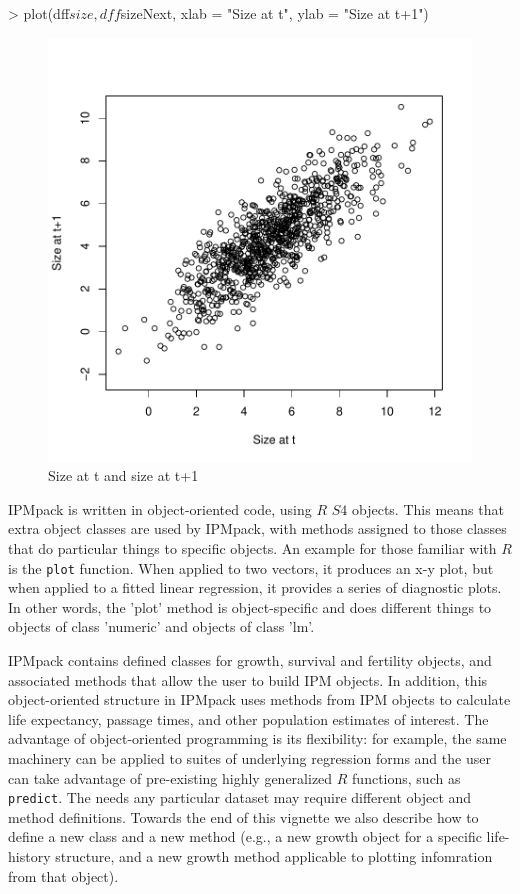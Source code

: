 \documentclass{article}
\begin{document}
\begin{Schunk}
\begin{Sinput}
> plot(dff$size, dff$sizeNext, xlab = "Size at t", ylab = "Size at t+1")
\end{Sinput}
\end{Schunk}
\begin{figure}
\begin{center}
\includegraphics{IPMpack_Vignette-fig0.pdf}
\end{center}
\caption{Size at t and size at t+1}
\label{fig:zero}
\end{figure}

IPMpack is written in object-oriented code, using $R$ $S4$ objects. This means that extra object classes are used by IPMpack, with methods assigned to those classes that do particular things to specific objects. An example for those familiar with $R$ is the {\tt plot} function. When applied to two vectors, it produces an x-y plot, but when applied to a fitted linear regression, it provides a series of diagnostic plots. In other words, the 'plot' method is object-specific and does different things to objects of class 'numeric' and objects of class 'lm'. 

IPMpack contains defined classes for growth, survival and fertility objects, and associated methods that allow the user to build IPM objects. In addition, this object-oriented structure in IPMpack uses methods from IPM objects to calculate life expectancy, passage times, and other population estimates of interest. The advantage of object-oriented programming is its flexibility: for example, the same machinery can be applied to suites of underlying regression forms and the user can take advantage of pre-existing highly generalized $R$ functions, such as {\tt predict}. The needs any particular dataset may require different object and method definitions. Towards the end of this vignette we also describe how to define a new class and a new method (e.g., a new growth object for a specific life-history structure, and a new growth method applicable to plotting infomration from that object).
\end{document}
